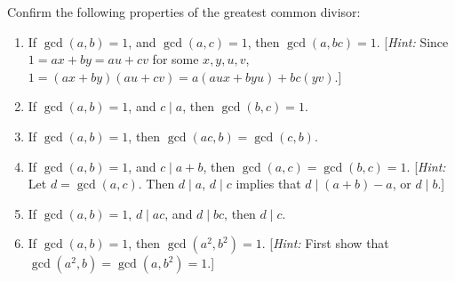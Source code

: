 \begin{exercise}
    Confirm the following properties of the greatest common divisor:
    \begin{enumerate}
        \item If $\gcd(a,b) = 1$, and $\gcd(a,c) = 1$, then $\gcd(a, bc) = 1$. [\textit{Hint:} Since $1 = ax + by = au + cv$ for some $x,y,u,v$, $1 = (ax + by)(au + cv) = a(aux + byu) + bc(yv)$.]
        \item If $\gcd(a,b) = 1$, and $c\mid a$, then $\gcd(b,c) = 1$.
        \item If $\gcd(a,b) = 1$, then $\gcd(ac,b) = \gcd(c,b)$.
        \item If $\gcd(a,b) = 1$, and $c \mid a+b$, then $\gcd(a,c) = \gcd(b,c) = 1$. [\textit{Hint:} Let $d = \gcd(a,c)$. Then $d \mid a$, $d \mid c$ implies that $d \mid (a+b) - a$, or $d\mid b$.]
        \item If $\gcd(a,b) = 1$, $d \mid ac$, and $d \mid bc$, then $d \mid c$.
        \item If $\gcd(a,b) = 1$, then $\gcd(a^2, b^2) = 1$. [\textit{Hint:} First show that $\gcd(a^2, b) = \gcd(a, b^2) = 1$.] 
    \end{enumerate}
\end{exercise}

